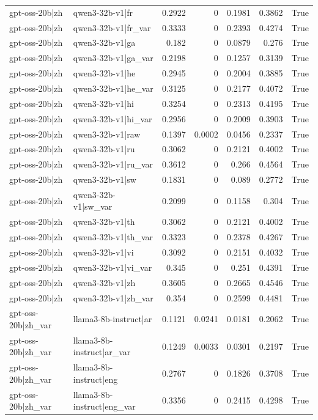 \begin{table}
\begin{tabular}{l l r r r r l}
gpt-oss-20b|zh & qwen3-32b-v1|fr & 0.2922 & 0 & 0.1981 & 0.3862 & True \\
gpt-oss-20b|zh & qwen3-32b-v1|fr_var & 0.3333 & 0 & 0.2393 & 0.4274 & True \\
gpt-oss-20b|zh & qwen3-32b-v1|ga & 0.182 & 0 & 0.0879 & 0.276 & True \\
gpt-oss-20b|zh & qwen3-32b-v1|ga_var & 0.2198 & 0 & 0.1257 & 0.3139 & True \\
gpt-oss-20b|zh & qwen3-32b-v1|he & 0.2945 & 0 & 0.2004 & 0.3885 & True \\
gpt-oss-20b|zh & qwen3-32b-v1|he_var & 0.3125 & 0 & 0.2177 & 0.4072 & True \\
gpt-oss-20b|zh & qwen3-32b-v1|hi & 0.3254 & 0 & 0.2313 & 0.4195 & True \\
gpt-oss-20b|zh & qwen3-32b-v1|hi_var & 0.2956 & 0 & 0.2009 & 0.3903 & True \\
gpt-oss-20b|zh & qwen3-32b-v1|raw & 0.1397 & 0.0002 & 0.0456 & 0.2337 & True \\
gpt-oss-20b|zh & qwen3-32b-v1|ru & 0.3062 & 0 & 0.2121 & 0.4002 & True \\
gpt-oss-20b|zh & qwen3-32b-v1|ru_var & 0.3612 & 0 & 0.266 & 0.4564 & True \\
gpt-oss-20b|zh & qwen3-32b-v1|sw & 0.1831 & 0 & 0.089 & 0.2772 & True \\
gpt-oss-20b|zh & qwen3-32b-v1|sw_var & 0.2099 & 0 & 0.1158 & 0.304 & True \\
gpt-oss-20b|zh & qwen3-32b-v1|th & 0.3062 & 0 & 0.2121 & 0.4002 & True \\
gpt-oss-20b|zh & qwen3-32b-v1|th_var & 0.3323 & 0 & 0.2378 & 0.4267 & True \\
gpt-oss-20b|zh & qwen3-32b-v1|vi & 0.3092 & 0 & 0.2151 & 0.4032 & True \\
gpt-oss-20b|zh & qwen3-32b-v1|vi_var & 0.345 & 0 & 0.251 & 0.4391 & True \\
gpt-oss-20b|zh & qwen3-32b-v1|zh & 0.3605 & 0 & 0.2665 & 0.4546 & True \\
gpt-oss-20b|zh & qwen3-32b-v1|zh_var & 0.354 & 0 & 0.2599 & 0.4481 & True \\
gpt-oss-20b|zh_var & llama3-8b-instruct|ar & 0.1121 & 0.0241 & 0.0181 & 0.2062 & True \\
gpt-oss-20b|zh_var & llama3-8b-instruct|ar_var & 0.1249 & 0.0033 & 0.0301 & 0.2197 & True \\
gpt-oss-20b|zh_var & llama3-8b-instruct|eng & 0.2767 & 0 & 0.1826 & 0.3708 & True \\
gpt-oss-20b|zh_var & llama3-8b-instruct|eng_var & 0.3356 & 0 & 0.2415 & 0.4298 & True \\

\end{tabular}
\end{table}
